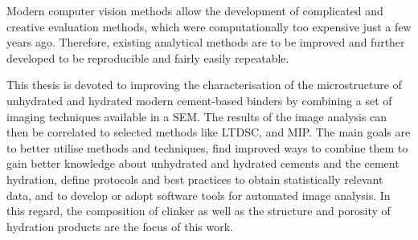 Modern computer vision methods allow the development of complicated and creative evaluation methods, which were computationally too expensive just a few years ago.
Therefore, existing analytical methods are to be improved and further developed to be reproducible and fairly easily repeatable.

This thesis is devoted to improving the characterisation of the microstructure of unhydrated and hydrated modern cement-based binders by combining a set of imaging techniques available in a \ac{SEM}.
The results of the image analysis can then be correlated to selected methods like \ac{LTDSC}, and \ac{MIP}.
The main goals are to better utilise methods and techniques, find improved ways to combine them to gain better knowledge about unhydrated and hydrated cements and the cement hydration, define protocols and best practices to obtain statistically relevant data, and to develop or adopt software tools for automated image analysis.
In this regard, the composition of clinker as well as the structure and porosity of hydration products are the focus of this work.


	


